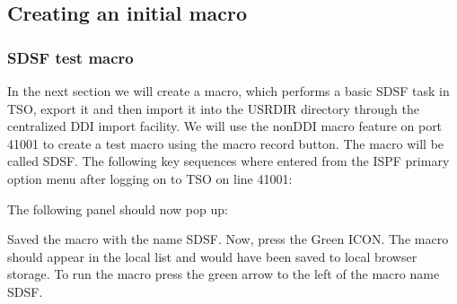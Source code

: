 \documentclass[letterpaper,10pt,english]{sphinxmanual}
\begin{document}
\subsection{Creating an initial macro}
\label{\detokenize{Customization:creating-an-initial-macro}}\label{\detokenize{Customization:index-86}}

\subsubsection{SDSF test macro}
\label{\detokenize{Customization:sdsf-test-macro}}
\sphinxAtStartPar
In the next section we will create a macro, which performs a basic SDSF task in TSO, export it and then import it into the USR\sphinxhyphen{}DIR directory through the centralized DDI import facility. We will use the non\sphinxhyphen{}DDI macro feature on port 41001 to create a test macro using the macro record button. The macro will be called SDSF. The following key sequences where entered from the ISPF primary option menu after logging on to TSO on line 41001:

\begin{sphinxVerbatim}[commandchars=\\\{\}]
          
        \PYG{p}{[}      \PYG{p}{]}
                                                          \PYG{p}{]}
                                                   
        
\end{sphinxVerbatim}

\sphinxAtStartPar
The following panel should now pop up:

\sphinxAtStartPar
{}

\sphinxAtStartPar
{}

\sphinxAtStartPar
Saved the macro with the name SDSF. Now, press the Green ICON. The macro should appear in the local list and would have been saved to local browser storage. To run the macro press the green arrow to the left of the macro name SDSF.
\end{document}
